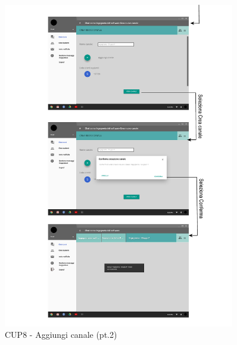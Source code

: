 \begin{figure}
	\centering
	\includegraphics[width=0.9\textwidth]{imgs/gruppo6/activities/act_cup8_aggiungi_canale2.pdf}
	\caption{CUP8 - Aggiungi canale (pt.2)}
	\label{fig:act-cup8-2}
\end{figure}

